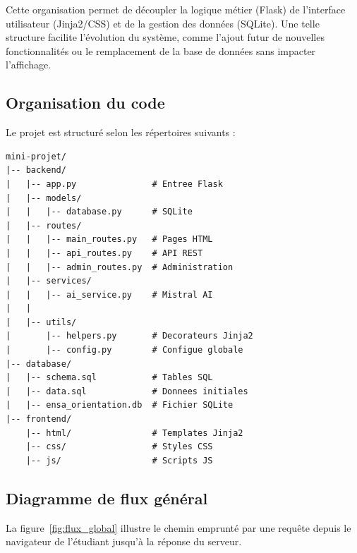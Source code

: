 \documentclass[a4paper,12pt]{article}
\begin{document}
Cette organisation permet de découpler la logique métier (Flask) de l'interface utilisateur (Jinja2/CSS) et de la gestion des données (SQLite). Une telle structure facilite l'évolution du système, comme l'ajout futur de nouvelles fonctionnalités ou le remplacement de la base de données sans impacter l'affichage.
\subsection{Organisation du code}

Le projet est structuré selon les répertoires suivants :

\begin{lstlisting}[style=filetree, caption={Arborescence du projet}, captionpos=b]
mini-projet/
|-- backend/
|   |-- app.py               # Entree Flask
|   |-- models/
|   |   |-- database.py      # SQLite
|   |-- routes/
|   |   |-- main_routes.py   # Pages HTML
|   |   |-- api_routes.py    # API REST
|   |   |-- admin_routes.py  # Administration
|   |-- services/
|   |   |-- ai_service.py    # Mistral AI
|   |  
|   |-- utils/
|       |-- helpers.py       # Decorateurs Jinja2
|       |-- config.py        # Configue globale
|-- database/
|   |-- schema.sql           # Tables SQL
|   |-- data.sql             # Donnees initiales
|   |-- ensa_orientation.db  # Fichier SQLite
|-- frontend/
    |-- html/                # Templates Jinja2
    |-- css/                 # Styles CSS
    |-- js/                  # Scripts JS
\end{lstlisting}

\subsection{Diagramme de flux général}
La figure~\ref{fig:flux_global} illustre le chemin emprunté par une requête depuis le navigateur de l’étudiant jusqu’à la réponse du serveur.

\end{document}
